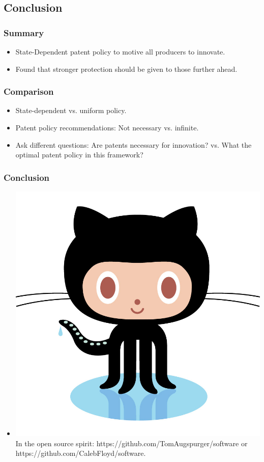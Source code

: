 \documentclass{beamer}
\begin{document}
\subsection{Conclusion}
\label{sub:conclusion}

\begin{frame}[t]\frametitle{Summary}
  \begin{itemize}
    \item<+-> State-Dependent patent policy to motive all producers to innovate.
    \item<+-> Found that stronger protection should be given to those further ahead.
  \end{itemize}  
\end{frame}

\begin{frame}[t]\frametitle{Comparison}
  \begin{itemize}
    \item State-dependent vs. uniform policy.
    \item Patent policy recommendations: Not necessary vs. infinite.
    \item Ask different questions: Are patents necessary for innovation? vs. What the optimal patent policy in this framework?
  \end{itemize}

\end{frame}

\begin{frame}[t]\frametitle{Conclusion}
  \begin{itemize}

    \item \includegraphics[scale=.025]{octocat.jpg} In the open source spirit: https://github.com/TomAugspurger/software or https://github.com/CalebFloyd/software.

  \end{itemize}    
\end{frame}
\end{document}
